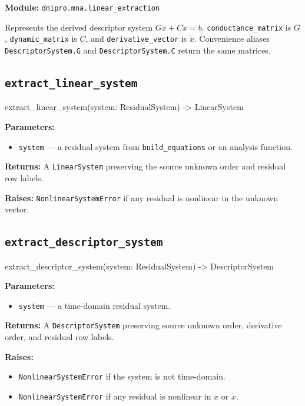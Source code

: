 \documentclass[11pt,a4paper]{article}
\newcommand{\code}[1]{\texttt{#1}}
\newenvironment{apisig}{%
  \begin{trivlist}\item\relax\ttfamily\small
}{%
  \end{trivlist}
}
\begin{document}
\textbf{Module:} \code{dnipro.mna.linear\_extraction}

Represents the derived descriptor system \(Gx + C\dot{x} = b\).
\code{conductance\_matrix} is \(G\), \code{dynamic\_matrix} is \(C\), and
\code{derivative\_vector} is \(\dot{x}\). Convenience aliases
\code{DescriptorSystem.G} and \code{DescriptorSystem.C} return the same matrices.

\subsection{\texttt{extract\_linear\_system}}
\label{api:extract_linear_system}

\begin{apisig}
extract\_linear\_system(system: ResidualSystem) -> LinearSystem
\end{apisig}

\textbf{Parameters:}
\begin{itemize}[noitemsep]
    \item \code{system} --- a residual system from \code{build\_equations} or an
          analysis function.
\end{itemize}

\textbf{Returns:} A \code{LinearSystem} preserving the source unknown order and
residual row labels.

\textbf{Raises:} \code{NonlinearSystemError} if any residual is nonlinear in the
unknown vector.

\subsection{\texttt{extract\_descriptor\_system}}
\label{api:extract_descriptor_system}

\begin{apisig}
extract\_descriptor\_system(system: ResidualSystem) -> DescriptorSystem
\end{apisig}

\textbf{Parameters:}
\begin{itemize}[noitemsep]
    \item \code{system} --- a time-domain residual system.
\end{itemize}

\textbf{Returns:} A \code{DescriptorSystem} preserving source unknown order,
derivative order, and residual row labels.

\textbf{Raises:}
\begin{itemize}[noitemsep]
    \item \code{NonlinearSystemError} if the system is not time-domain.
    \item \code{NonlinearSystemError} if any residual is nonlinear in \(x\) or
          \(\dot{x}\).
\end{itemize}
\end{document}
